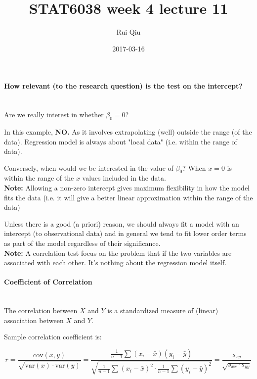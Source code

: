 \documentclass[a4paper, 11pt, twoside]{article}
\begin{document}
\title{STAT6038 week 4 lecture 11}
\author{Rui Qiu}
\date{2017-03-16}

\maketitle

\paragraph{How relevant (to the research question) is the test on the intercept?}\ \\

Are we really interest in whether $\beta_0=0$?

In this example, \textbf{NO.} As it involves extrapolating (well) outside the range (of the data). Regression model is always about "local data" (i.e. within the range of data).

Conversely, when would we be interested in the value of $\beta_0$? When $x=0$ is  within the range of the $x$ values included in the data.\\

\textbf{Note:} Allowing a non-zero intercept gives maximum flexibility in how the model fits the data (i.e. it will give a better linear approximation within the range of the data)

Unless there is a good (a priori) reason, we should always fit a model with an intercept (to observational data) and in general we tend to fit lower order terms as part of the model regardless of their significance.\\

\textbf{Note:} A correlation test focus on the problem that if the two variables are associated with each other. It's nothing about the regression model itself.\\

\paragraph{Coefficient of Correlation}\ \\

The correlation between $X$ and $Y$ is a standardized measure of (linear) association between $X$ and $Y$.

Sample correlation coefficient is:

\[r = \frac{\text{cov}(x,y)}{\sqrt{\text{var}(x)\cdot \text{var}(y)}} = \frac{\frac{1}{n-1}\sum(x_i-\bar{x})(y_i-\bar{y})}{\sqrt{\frac{1}{n-1}\sum(x_i-\bar{x})^2\cdot \frac{1}{n-1}\sum(y_i-\bar{y})^2}} = \frac{s_{xy}}{\sqrt{s_{xx}\cdot s_{yy}}}\]
\end{document}
